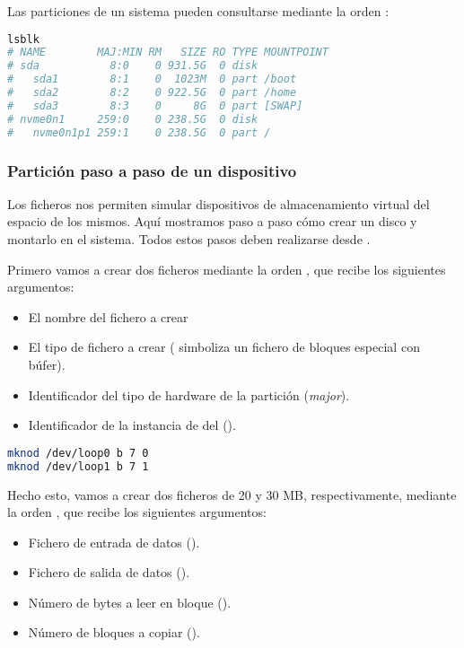 Las particiones de un sistema pueden consultarse mediante la orden :

\begin{lstlisting}[language=Bash]
lsblk
# NAME        MAJ:MIN RM   SIZE RO TYPE MOUNTPOINT
# sda           8:0    0 931.5G  0 disk
#   sda1        8:1    0  1023M  0 part /boot
#   sda2        8:2    0 922.5G  0 part /home
#   sda3        8:3    0     8G  0 part [SWAP]
# nvme0n1     259:0    0 238.5G  0 disk
#   nvme0n1p1 259:1    0 238.5G  0 part /
\end{lstlisting}

\subsubsection{Partición paso a paso de un dispositivo}

Los ficheros  nos permiten simular dispositivos de almacenamiento virtual del espacio de los mismos.
Aquí mostramos paso a paso cómo crear un disco  y montarlo en el sistema.
Todos estos pasos deben realizarse desde .

Primero vamos a crear dos ficheros  mediante la orden , que recibe los siguientes argumentos:

\begin{itemize}
	\item El nombre del fichero a crear
	\item El tipo de fichero a crear ( simboliza un fichero de bloques especial con búfer).
	\item Identificador del tipo de hardware de la partición (\emph{major}).
	\item Identificador de la instancia de del  ().
\end{itemize}

\begin{lstlisting}[language=Bash]
mknod /dev/loop0 b 7 0
mknod /dev/loop1 b 7 1
\end{lstlisting}

Hecho esto, vamos a crear dos ficheros de 20 y 30 MB, respectivamente, mediante la orden , que recibe los siguientes argumentos:

\begin{itemize}
	\item Fichero de entrada de datos ().
	\item Fichero de salida de datos ().
	\item Número de bytes a leer en bloque ().
	\item Número de bloques a copiar ().
\end{itemize}

